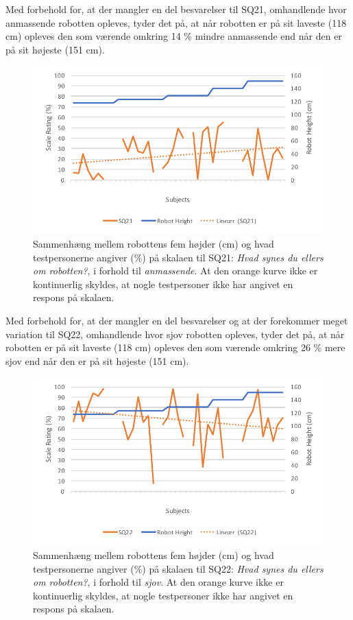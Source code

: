 \noindent
%
Med forbehold for, at der mangler en del besvarelser til SQ21, omhandlende hvor anmassende robotten opleves, tyder det på, at når robotten er på sit laveste (118 cm) opleves den som værende omkring 14 \% mindre anmassende end når den er på sit højeste (151 cm).
%
\begin{figure}[H]
\centering
\includegraphics[width=\textwidth]{Figure/DatabehandlingSkalaer/TendensHeight/HeightSQ21}
\caption{Sammenhæng mellem robottens fem højder (cm) og hvad testpersonerne angiver (\%) på skalaen til SQ21: \textit{Hvad synes du ellers om robotten?}, i forhold til \textit{anmassende}. At den orange kurve ikke er kontinuerlig skyldes, at nogle testpersoner ikke har angivet en respons på skalaen.}
\label{fig:TendensHeightSQ21}
\end{figure}
\noindent
%
Med forbehold for, at der mangler en del besvarelser og at der forekommer meget variation til SQ22, omhandlende hvor sjov robotten opleves, tyder det på, at når robotten er på sit laveste (118 cm) opleves den som værende omkring 26 \% mere sjov end når den er på sit højeste (151 cm).
%
\begin{figure}[H]
\centering
\includegraphics[width=\textwidth]{Figure/DatabehandlingSkalaer/TendensHeight/HeightSQ22}
\caption{Sammenhæng mellem robottens fem højder (cm) og hvad testpersonerne angiver (\%) på skalaen til SQ22: \textit{Hvad synes du ellers om robotten?}, i forhold til \textit{sjov}. At den orange kurve ikke er kontinuerlig skyldes, at nogle testpersoner ikke har angivet en respons på skalaen.}
\label{fig:TendensHeightSQ22}
\end{figure}
\noindent
%